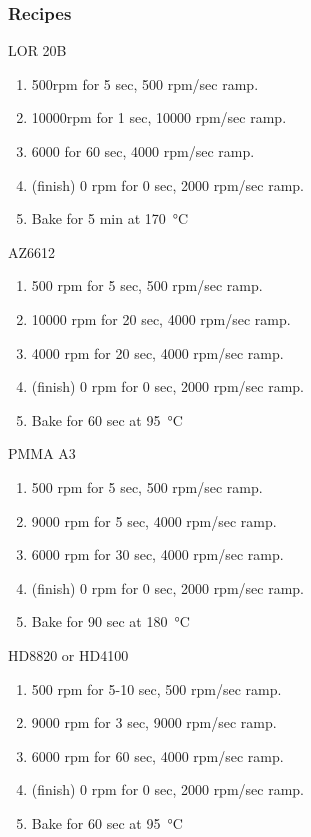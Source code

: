 \subsubsection{Recipes}
\begin{description}
\item {LOR 20B}
  \begin{enumerate}
  \item 500rpm for 5 sec, 500 rpm/sec ramp.
  \item 10000rpm for 1 sec, 10000 rpm/sec ramp.
  \item 6000 for 60 sec, 4000 rpm/sec ramp.
  \item (finish) 0 rpm for 0 sec, 2000 rpm/sec ramp.
  \item Bake for 5 min at \SI{170}{\celsius}
  \end{enumerate}
\item {AZ6612}
  \begin{enumerate}
  \item 500 rpm for 5 sec, 500 rpm/sec ramp.
  \item 10000 rpm for 20 sec, 4000 rpm/sec ramp.
  \item 4000 rpm for 20 sec, 4000 rpm/sec ramp.
  \item (finish) 0 rpm for 0 sec, 2000 rpm/sec ramp.
  \item Bake for 60 sec at \SI{95}{\celsius}
  \end{enumerate}
\item {PMMA A3}
  \begin{enumerate}
  \item 500 rpm for 5 sec, 500 rpm/sec ramp.
  \item 9000 rpm for 5 sec, 4000 rpm/sec ramp.
  \item 6000 rpm for 30 sec, 4000 rpm/sec ramp.
  \item (finish) 0 rpm for 0 sec, 2000 rpm/sec ramp.
  \item Bake for 90 sec at \SI{180}{\celsius}
  \end{enumerate}
\item {HD8820 or HD4100}
  \begin{enumerate}
  \item 500 rpm for 5-10 sec, 500 rpm/sec ramp.
  \item 9000 rpm for 3 sec, 9000 rpm/sec ramp.
  \item 6000 rpm for 60 sec, 4000 rpm/sec ramp.
  \item (finish) 0 rpm for 0 sec, 2000 rpm/sec ramp.
  \item Bake for 60 sec at \SI{95}{\celsius}
  \end{enumerate}
\end{description}

